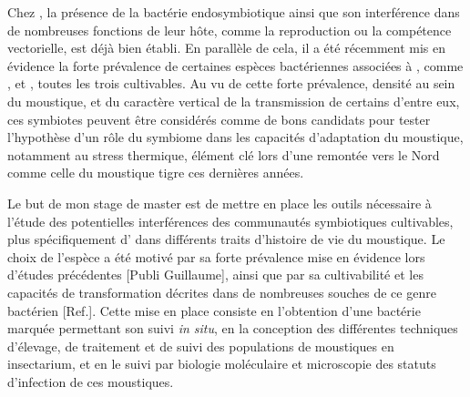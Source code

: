 Chez , la présence de la bactérie endosymbiotique  ainsi que son interférence dans de nombreuses fonctions de leur hôte, comme la reproduction ou la compétence vectorielle, est déjà bien établi.
En parallèle de cela, il a été récemment mis en évidence la forte prévalence de certaines espèces bactériennes associées à , comme ,  et , toutes les trois cultivables.
Au vu de cette forte prévalence, densité au sein du moustique, et du caractère vertical de la transmission de certains d'entre eux, ces symbiotes peuvent être considérés comme de bons candidats pour tester l'hypothèse d'un rôle du symbiome dans les capacités d'adaptation du moustique, notamment au stress thermique, élément clé lors d'une remontée vers le Nord comme celle du moustique tigre ces dernières années.

Le but de mon stage de master est de mettre en place les outils nécessaire à l'étude des potentielles interférences des communautés symbiotiques cultivables, plus spécifiquement d' dans différents traits d'histoire de vie du moustique.
Le choix de l'espèce  a été motivé par sa forte prévalence mise en évidence lors d'études précédentes [Publi Guillaume], ainsi que par sa cultivabilité et les capacités de transformation décrites dans de nombreuses souches de ce genre bactérien [Ref.].
Cette mise en place consiste en l'obtention d'une bactérie marquée permettant son suivi \textit{in situ}, en la conception des différentes techniques d'élevage, de traitement et de suivi des populations de moustiques en insectarium, et en le suivi par biologie moléculaire et microscopie des statuts d'infection de ces moustiques.